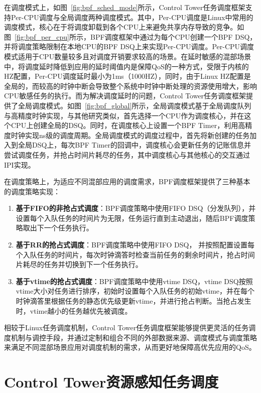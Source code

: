 在调度模式上，如图~\ref{fig:bpf_sched_mode}所示，Control Tower任务调度框架支持Per-CPU调度与全局调度两种调度模式。其中，Per-CPU调度是Linux中常用的调度模式，核心在于将调度卸载到各个CPU上来避免共享内存导致的竞争。如图~\ref{fig:bpf_per_cpu}所示，BPF调度框架中通过为每个CPU创建一个BPF DSQ，并将调度策略限制在本地CPU的BPF DSQ上来实现Per-CPU调度。Per-CPU调度模式适用于CPU数量较多且对调度开销要求较高的场景。在延时敏感的混部场景中，将调度延时降低到应用的延时阈值内是保障QoS的一种方式，受限于内核的HZ配置，Per-CPU调度延时最小为1ms（1000HZ），同时，由于Linux HZ配置是全局的，而较高的时钟中断会导致整个系统中时钟中断处理的资源使用增大，影响CPU敏感任务的执行。而为解决调度延时的问题，Control Tower任务调度框架提供了全局调度模式。如图~\ref{fig:bpf_global}所示，全局调度模式基于全局调度队列与高精度时钟实现，与其他研究类似，首先选择一个CPU作为调度核心，并在这个CPU上创建全局的DSQ。同时，在调度核心上设置一个BPF Timer，利用高精度时钟实现ns级的调度周期。全局调度模式的调度过程中，首先将新创建的任务加入到全局DSQ上，每次BPF Timer的回调中，调度核心会更新任务的记账信息并尝试调度任务，并抢占时间片耗尽的任务，其中调度核心与其他核心的交互通过IPI实现。

在调度策略上，为适应不同混部应用的调度需求，BPF调度框架提供了三种基本的调度策略实现：

\begin{enumerate}
    \item \textbf{基于FIFO的非抢占式调度}：BPF调度策略中使用FIFO DSQ（分发队列），并设置每个入队任务的时间片为无限，任务运行直到主动退出，随后BPF调度策略取出下一个任务执行。
    \item \textbf{基于RR的抢占式调度}：BPF调度策略中使用FIFO DSQ， 并按照配置设置每个入队任务的时间片，每次时钟滴答时检查当前任务的剩余时间片，抢占时间片耗尽的任务并切换到下一个任务执行。
    \item \textbf{基于vtime的抢占式调度}：BPF调度策略中使用vtime DSQ，vtime DSQ按照vtime大小对任务进行排序，初始时设置每个入队任务的初始vtime，并在每个时钟滴答里根据任务的静态优先级更新vtime，并进行抢占判断。当抢占发生时，vtime越小的任务越优先被调度。
\end{enumerate}

相较于Linux任务调度机制，Control Tower任务调度框架能够提供更灵活的任务调度机制与调控手段，并通过定制和组合不同的外部数据来源、调度模式与调度策略来满足不同混部场景应用对调度机制的需求，从而更好地保障高优先应用的QoS。

\section{Control Tower资源感知任务调度}

